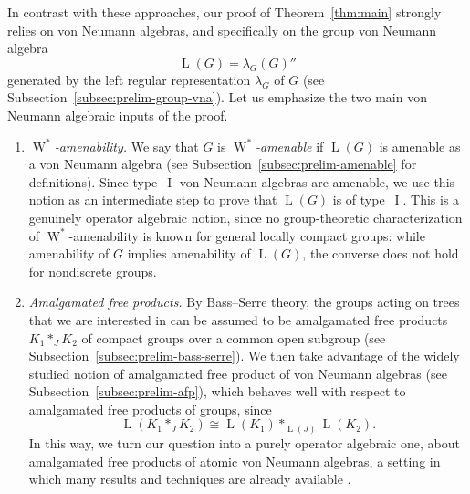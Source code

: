 \documentclass[11pt]{amsart}
\numberwithin{equation}{section}
\DeclareMathOperator{\LL}{L}
\DeclareMathOperator{\I}{I}
\newcommand{\Wstar}{\operatorname{W}^*}
\theoremstyle{definition}
\begin{document}
In contrast with these approaches, our proof of Theorem~\ref{thm:main} strongly relies on von Neumann algebras, and specifically on the group von Neumann algebra
$$
    \LL(G)=\lambda_G(G)''
$$
generated by the left regular representation $\lambda_G$ of $G$ (see Subsection~\ref{subsec:prelim-group-vna}). Let us emphasize the two main von Neumann algebraic inputs of the proof.
\begin{enumerate}[\rm (1)]
    \item \emph{$\Wstar$-amenability.} We say that $G$ is \emph{$\Wstar$-amenable} if $\LL(G)$ is amenable as a von Neumann algebra (see Subsection~\ref{subsec:prelim-amenable} for definitions). Since type~$\I$ von Neumann algebras are amenable, we use this notion as an intermediate step to prove that $\LL(G)$ is of type~$\I$. This is a genuinely operator algebraic notion, since no group-theoretic characterization of $\Wstar$-amenability is known for general locally compact groups: while amenability of $G$ implies amenability of $\LL(G)$, the converse does not hold for nondiscrete groups. 
    \item \emph{Amalgamated free products.} By Bass--Serre theory, the groups acting on trees that we are interested in can be assumed to be amalgamated free products $K_1\ast_JK_2$ of compact groups over a common open subgroup (see Subsection~\ref{subsec:prelim-bass-serre}). We then take advantage of the widely studied notion of amalgamated free product of von Neumann algebras (see Subsection~\ref{subsec:prelim-afp}), which behaves well with respect to amalgamated free products of groups, since
    $$
        \LL(K_1\ast_JK_2)\cong\LL(K_1)\ast_{\LL(J)}\LL(K_2).
    $$
    In this way, we turn our question into a purely operator algebraic one, about amalgamated free products of atomic von Neumann algebras, a setting in which many results and techniques are already available \cite{Dy93,Dy95,DR13,Re13,Ue11,Ue13}.
\end{enumerate}
\end{document}

